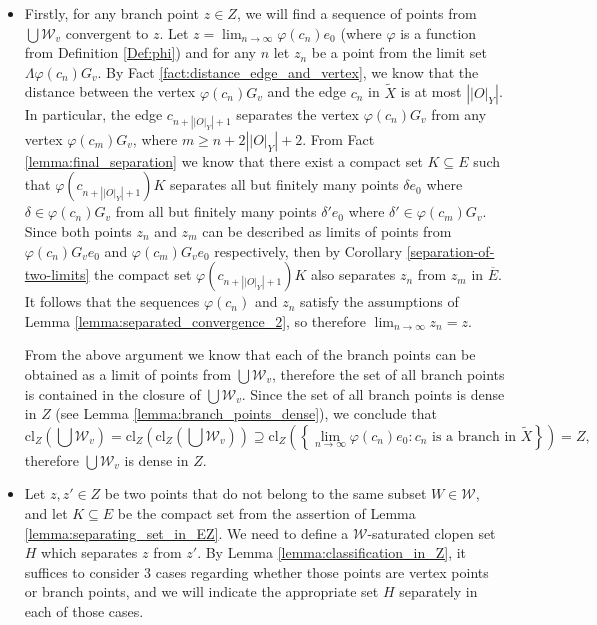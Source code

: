 \documentclass[12pt, a4paper]{article}
\newcommand{\8}{\infty}
\newcommand{\abs}[1]{\left| #1 \right|}
\newcommand{\set}[1]{\left\{ #1 \right\}}
\theoremstyle{break}
\theoremstyle{defbreak}
\newcommand{\ol}[1]{\overline{#1}}
\newcommand{\wtl}[1]{\widetilde{#1}}
\newcounter{todocounter}
\newcommand{\todo}{\textcolor{red}{\textbf{TODO \thetodocounter} \addtocounter{todocounter}{1}}}
\begin{document}
\begin{itemize}
        \item[(a4)] Firstly, for any branch point $z\in Z$, we will find a sequence of points from $\bigcup \mathcal{W}_v$ convergent to $z$. Let $z = \lim_{n\to\8}\varphi(c_n)e_0$ (where $\varphi$ is a function from Definition \ref{Def:phi}) and for any $n$ let $z_n$ be a point from the limit set $\Lambda \varphi(c_n)G_v$. By Fact \ref{fact:distance_edge_and_vertex}, we know that the distance between the vertex $\varphi(c_n)G_v$ and the edge $c_n$ in $\wtl{X}$ is at most $\abs{\abs{O}_Y}$. In particular, the edge $c_{n+\abs{\abs{O}_Y}+1}$ separates the vertex $\varphi(c_n)G_v$ from any vertex $\varphi(c_m)G_v$, where $m\geqslant n+2\abs{\abs{O}_Y}+2$. From Fact \ref{lemma:final_separation} we know that there exist a compact set $K\subseteq E$ such that $\varphi(c_{n+\abs{\abs{O}_Y}+1})K$ separates all but finitely many points $\delta e_0$ where $\delta\in \varphi(c_n)G_v$ from all but finitely many points $\delta' e_0$ where $\delta'\in \varphi(c_m)G_v$. Since both points $z_n$ and $z_m$ can be described as limits of points from $\varphi(c_n)G_ve_0$ and $\varphi(c_m)G_ve_0$ respectively, then by Corollary \ref{separation-of-two-limits} the compact set $\varphi(c_{n+\abs{\abs{O}_Y}+1})K$ also separates $z_n$ from $z_m$ in $\ol{E}$. %
        It follows that the sequences $\varphi(c_n)$ and $z_n$ satisfy the assumptions of Lemma \ref{lemma:separated_convergence_2}, so therefore $\lim_{n\to\8} z_n = z$. 
        
        From the above argument we know that each of the branch points can be obtained as a limit of points from $\bigcup \mathcal{W}_v$, therefore the set of all branch points is contained in the closure of $\bigcup \mathcal{W}_v$. Since the set of all branch points is dense in $Z$
        (see Lemma \ref{lemma:branch_points_dense}), we conclude that
        $$\text{cl}_Z\left(\bigcup \mathcal{W}_v\right) = \text{cl}_Z\left(\text{cl}_Z\left(\bigcup \mathcal{W}_v\right)\right) \supseteq \text{cl}_Z\left(\set{\lim_{n\to\8}\varphi(c_n)e_0: c_n\text{ is a branch in }\wtl{X}}\right) = Z,$$ 
        therefore $\bigcup \mathcal{W}_v$ is dense in $Z$.
        
        \item[(a5)] Let $z, z'\in Z$ be two points that do not belong to the same subset $W\in \mathcal{W}$, and let $K\subseteq E$ be the compact set from the assertion of Lemma \ref{lemma:separating_set_in_EZ}. We need to define a $\mathcal{W}$-saturated clopen set $H$ which separates $z$ from $z'$. By Lemma \ref{lemma:classification_in_Z}, it suffices to consider $3$ cases regarding whether those points are vertex points or branch points, and we will  indicate the appropriate set $H$ separately in each of those cases.


\end{itemize}
\end{document}

